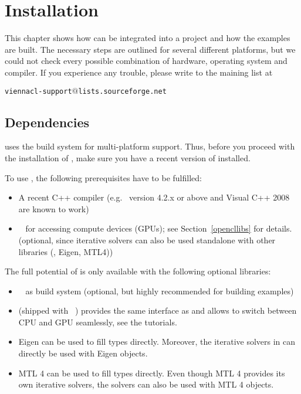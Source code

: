\chapter{Installation}

This chapter shows how {\ViennaCL} can be integrated into a project and how the
examples are built. The necessary steps are outlined for several different
platforms, but we could not check every possible combination of hardware,
operating system and compiler. If you experience any trouble, please write to
the maining list at \\
\begin{center}
\texttt{viennacl-support$@$lists.sourceforge.net} 
\end{center}


\section{Dependencies}
\label{dependencies}
{\ViennaCL} uses the {\CMake} build system for multi-platform support.
Thus, before you proceed with the installation of {\ViennaCL}, make sure you
have a recent version of {\CMake} installed.

To use {\ViennaCL}, the following prerequisites have to be fulfilled:
\begin{itemize}
 \item A recent C++ compiler (e.g.~{\GCC} version 4.2.x or above and Visual C++
2008 are known to work)
 \item {\OpenCL}~\cite{khronoscl,nvidiacl} for accessing compute devices (GPUs);
see Section~\ref{opencllibs} for details.
(optional, since iterative solvers can also be used standalone with other libraries (\ublas, Eigen, MTL4))
\end{itemize}


The full potential of {\ViennaCL} is only available with the following optional libraries:
\begin{itemize}
 \item {\CMake}~\cite{cmake} as build system (optional, but highly recommended for building examples)
 \item {\ublas} (shipped with {\Boost}~\cite{boost}) provides the same interface as {\ViennaCL} and allows to switch between CPU and GPU seamlessly, see the tutorials.
 \item Eigen \cite{eigen} can be used to fill {\ViennaCL} types directly. Moreover, the iterative solvers in {\ViennaCL} can directly be used with Eigen objects.
 \item MTL 4 \cite{mtl4} can be used to fill {\ViennaCL} types directly. Even though MTL 4 provides its own iterative solvers, the {\ViennaCL} solvers can also be used with MTL 4 objects.
\end{itemize}

